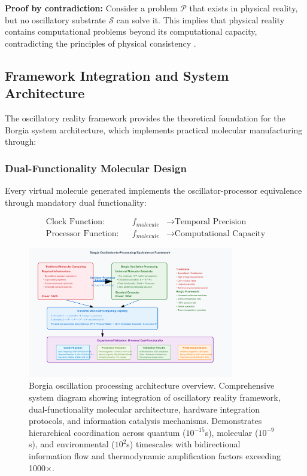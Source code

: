 \documentclass[12pt,a4paper]{article}
\begin{document}
\textbf{Proof by contradiction:} Consider a problem $\mathcal{P}$ that exists in physical reality, but no oscillatory substrate $\mathcal{S}$ can solve it. This implies that physical reality contains computational problems beyond its computational capacity, contradicting the principles of physical consistency \cite{lloyd2000ultimate,sterling2015principles}.

\subsection{Framework Integration and System Architecture}

The oscillatory reality framework provides the theoretical foundation for the Borgia system architecture, which implements practical molecular manufacturing through:

\subsubsection{Dual-Functionality Molecular Design}

Every virtual molecule generated implements the oscillator-processor equivalence through mandatory dual functionality:

\begin{align}
\text{Clock Function}: &&f_{molecule} &\rightarrow \text{Temporal Precision} \\
\text{Processor Function}: &&f_{molecule} &\rightarrow \text{Computational Capacity}
\end{align}

\begin{figure}[H]
    \centering
    \includegraphics[width=0.8\textwidth]{images/borgia-oscillation-processing.pdf}
    \caption{Borgia oscillation processing architecture overview. Comprehensive system diagram showing integration of oscillatory reality framework, dual-functionality molecular architecture, hardware integration protocols, and information catalysis mechanisms. Demonstrates hierarchical coordination across quantum ($10^{-15}$s), molecular ($10^{-9}$s), and environmental ($10^2$s) timescales with bidirectional information flow and thermodynamic amplification factors exceeding 1000×.}
    \label{fig:borgia_architecture}
\end{figure}
\end{document}
